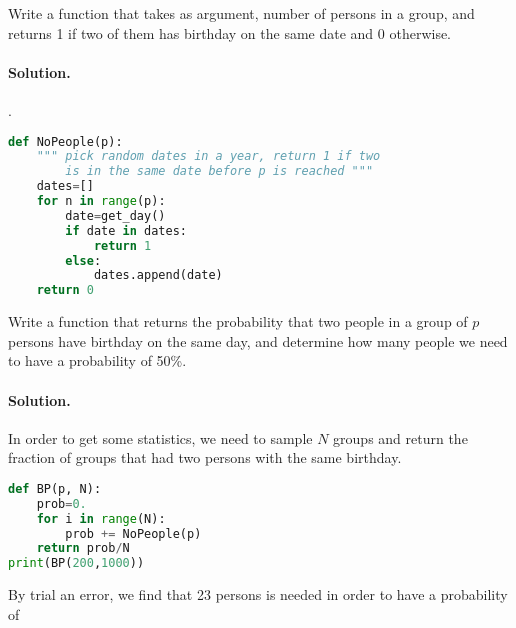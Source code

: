 \documentclass[graybox,sectrefs,envcountresetchap,open=right,final]{svmonodo}
\makeatletter
\newenvironment{doconceexercise}{}{}
\def\cleardoublepage{\clearpage\if@twoside \ifodd\c@page\else
\hbox{}
\thispagestyle{empty}
\newpage
\if@twocolumn\hbox{}\newpage\fi\fi\fi}
\makeatother
\begin{document}
\begin{doconceexercise}
Write a function that takes as argument, number of persons in a group,
and returns 1 if two of them has birthday on the same date and 0
otherwise.

\paragraph{Solution.}
. 












\begin{lstlisting}[language=python,style=blue1]
def NoPeople(p):
    """ pick random dates in a year, return 1 if two
        is in the same date before p is reached """
    dates=[]
    for n in range(p):
        date=get_day()
        if date in dates:
            return 1
        else:
            dates.append(date)
    return 0

\end{lstlisting}




Write a function that returns the probability that two people in a
group of $p$ persons have birthday on the same day, and determine how
many people we need to have a probability of 50\%.

\paragraph{Solution.}
In order to get some statistics, we need to sample $N$ groups and
return the fraction of groups that had two persons with the same birthday.







\begin{lstlisting}[language=python,style=blue1]
def BP(p, N):
    prob=0.
    for i in range(N):
        prob += NoPeople(p)
    return prob/N
print(BP(200,1000))

\end{lstlisting}

By trial an error, we find that 23 persons is needed in order to have
a probability of


\end{doconceexercise}


\clearemptydoublepage
{}
\thispagestyle{empty}





\cleardoublepage{}  %
\printindex
\end{document}

